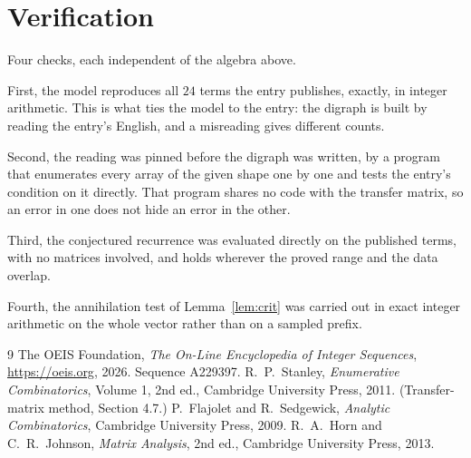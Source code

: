 \documentclass[11pt,a4paper]{article}
\theoremstyle{plain}
\theoremstyle{definition}
\begin{document}
\section{Verification}

Four checks, each independent of the algebra above.

First, the model reproduces all $24$ terms the entry publishes, exactly, in integer
arithmetic. This is what ties the model to the entry: the digraph is built by reading the
entry's English, and a misreading gives different counts.

Second, the reading was pinned before the digraph was written, by a program that enumerates
every array of the given shape one by one and tests the entry's condition on it directly. That program shares no code with the transfer matrix, so an error in one does not
hide an error in the other.

Third, the conjectured recurrence was evaluated directly on the published terms, with no
matrices involved, and holds wherever the proved range and the data overlap.

Fourth, the annihilation test of Lemma~\ref{lem:crit} was carried out in exact integer
arithmetic on the whole vector rather than on a sampled prefix.

\begin{thebibliography}{9}
 The OEIS Foundation, \emph{The On-Line Encyclopedia of Integer
Sequences}, \url{https://oeis.org}, 2026. Sequence A229397.
 R.~P.~Stanley, \emph{Enumerative Combinatorics}, Volume 1, 2nd ed.,
Cambridge University Press, 2011. (Transfer-matrix method, Section 4.7.)
 P.~Flajolet and R.~Sedgewick, \emph{Analytic Combinatorics}, Cambridge
University Press, 2009.
 R.~A.~Horn and C.~R.~Johnson, \emph{Matrix Analysis}, 2nd ed., Cambridge
University Press, 2013.
\end{thebibliography}
\end{document}

